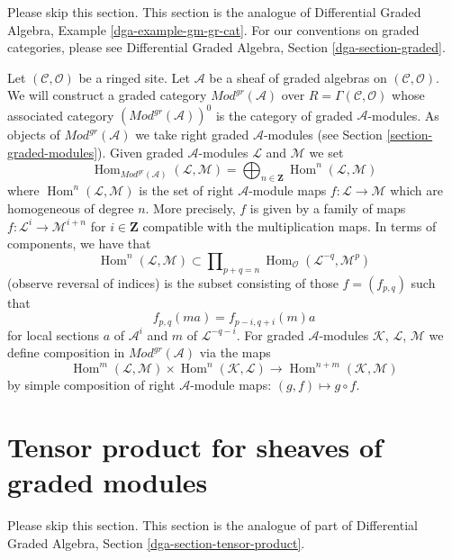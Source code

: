 \documentclass{stacks-project}
\theoremstyle{plain}
\theoremstyle{definition}
\theoremstyle{remark}
\numberwithin{equation}{subsection}
\def\Hom{\mathop{\mathrm{Hom}}\nolimits}
\begin{document}
\noindent
Please skip this section. This section is the analogue of
Differential Graded Algebra, Example \ref{dga-example-gm-gr-cat}.
For our conventions on graded categories, please see
Differential Graded Algebra, Section \ref{dga-section-graded}.

\medskip\noindent
Let $(\mathcal{C}, \mathcal{O})$ be a ringed site.
Let $\mathcal{A}$ be a sheaf of graded algebras
on $(\mathcal{C}, \mathcal{O})$. We will construct
a graded category $\textit{Mod}^{gr}(\mathcal{A})$ over
$R = \Gamma(\mathcal{C}, \mathcal{O})$
whose associated category $(\textit{Mod}^{gr}(\mathcal{A}))^0$
is the category of graded $\mathcal{A}$-modules. As objects
of $\textit{Mod}^{gr}(\mathcal{A})$ we take right graded
$\mathcal{A}$-modules (see
Section \ref{section-graded-modules}). Given graded
$\mathcal{A}$-modules $\mathcal{L}$ and $\mathcal{M}$ we set
$$
\Hom_{\textit{Mod}^{gr}(\mathcal{A})}(\mathcal{L}, \mathcal{M}) =
\bigoplus\nolimits_{n \in \mathbf{Z}} \Hom^n(\mathcal{L}, \mathcal{M})
$$
where
$\Hom^n(\mathcal{L}, \mathcal{M})$
is the set of right $\mathcal{A}$-module maps
$f : \mathcal{L} \to \mathcal{M}$ which
are homogeneous of degree $n$. More precisely, $f$ is given
by a family of maps $f : \mathcal{L}^i \to \mathcal{M}^{i + n}$
for $i \in \mathbf{Z}$ compatible with the multiplication
maps. In terms of components, we have that
$$
\Hom^n(\mathcal{L}, \mathcal{M})
\subset
\prod\nolimits_{p + q = n}
\Hom_\mathcal{O}(\mathcal{L}^{-q}, \mathcal{M}^p)
$$
(observe reversal of indices) is the subset consisting of those
$f = (f_{p, q})$ such that
$$
f_{p, q}(m a) = f_{p - i, q + i}(m)a
$$
for local sections $a$ of $\mathcal{A}^i$ and
$m$ of $\mathcal{L}^{-q - i}$. For graded $\mathcal{A}$-modules
$\mathcal{K}$, $\mathcal{L}$, $\mathcal{M}$
we define composition in $\textit{Mod}^{gr}(\mathcal{A})$ via
the maps
$$
\Hom^m(\mathcal{L}, \mathcal{M}) \times
\Hom^n(\mathcal{K}, \mathcal{L}) \longrightarrow
\Hom^{n + m}(\mathcal{K}, \mathcal{M})
$$
by simple composition of right
$\mathcal{A}$-module maps: $(g, f) \mapsto g \circ f$.





\section{Tensor product for sheaves of graded modules}
\label{section-tensor-product}

\noindent
Please skip this section. This section is the analogue of part of
Differential Graded Algebra, Section \ref{dga-section-tensor-product}.
\end{document}
